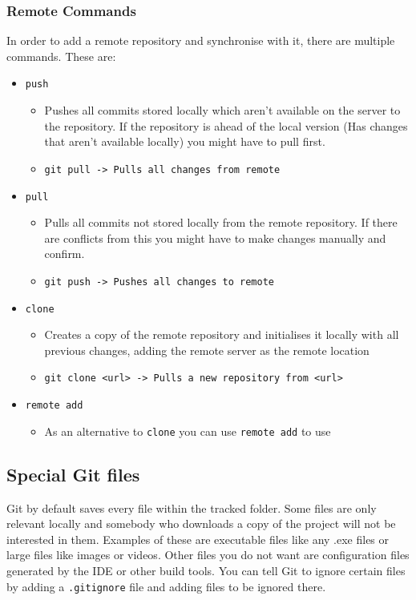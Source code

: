 \documentclass{article}
\begin{document}
	\subsubsection{Remote Commands}
	In order to add a remote repository and synchronise with it, there are multiple commands. These are:
	\begin{itemize}
		\item{\texttt{push}}
		\begin{itemize}
			\item{Pushes all commits stored locally which aren't available on the server to the repository. If the repository is ahead of the local version (Has changes that aren't available locally) you might have to pull first.}
			\item{\texttt{git pull -> Pulls all changes from remote}}
		\end{itemize}
		\item{\texttt{pull}}
		\begin{itemize}
			\item{Pulls all commits not stored locally from the remote repository. If there are conflicts from this you might have to make changes manually and confirm.}
			\item{\texttt{git push -> Pushes all changes to remote}}
		\end{itemize}
		\item{\texttt{clone}}
		\begin{itemize}
			\item{Creates a copy of the remote repository and initialises it locally with all previous changes, adding the remote server as the remote location}
			\item{\texttt{git clone <url> -> Pulls a new repository from <url>}}
		\end{itemize}
		\item{\texttt{remote add}}
		\begin{itemize}
			\item{As an alternative to \texttt{clone} you can use \texttt{remote add} to use} 
		\end{itemize}
	\end{itemize}
	\subsection{Special Git files}
	Git by default saves every file within the tracked folder. Some files are only relevant locally and somebody who downloads a copy of the project will not be interested in them. Examples of these are executable files like any .exe files or large files like images or videos. Other files you do not want are configuration files generated by the IDE or other build tools. You can tell Git to ignore certain files by adding a \texttt{.gitignore} file and adding files to be ignored there.
\end{document}
